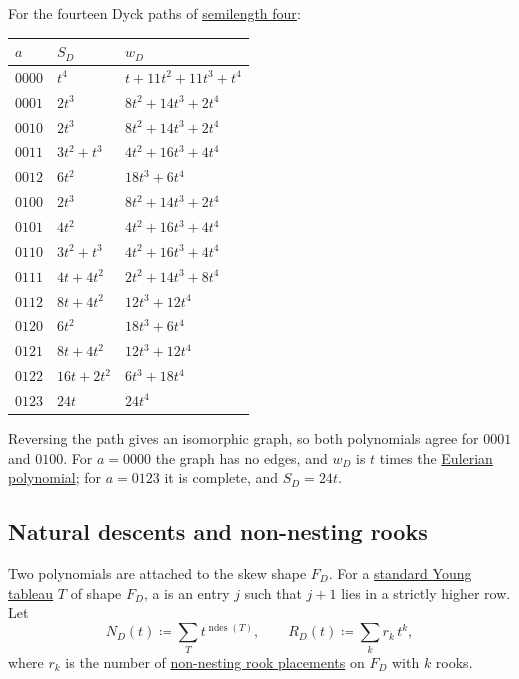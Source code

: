 \begin{example*}
For the fourteen Dyck paths of
\hyperref[dyckPathSemilengthFour]{semilength four}:

\begin{tabular}{lll}
\toprule
$a$ & $S_D$ & $w_D$ \\
\midrule
$0000$ & $t^4$ & $t+11t^2+11t^3+t^4$ \\
$0001$ & $2t^3$ & $8t^2+14t^3+2t^4$ \\
$0010$ & $2t^3$ & $8t^2+14t^3+2t^4$ \\
$0011$ & $3t^2+t^3$ & $4t^2+16t^3+4t^4$ \\
$0012$ & $6t^2$ & $18t^3+6t^4$ \\
$0100$ & $2t^3$ & $8t^2+14t^3+2t^4$ \\
$0101$ & $4t^2$ & $4t^2+16t^3+4t^4$ \\
$0110$ & $3t^2+t^3$ & $4t^2+16t^3+4t^4$ \\
$0111$ & $4t+4t^2$ & $2t^2+14t^3+8t^4$ \\
$0112$ & $8t+4t^2$ & $12t^3+12t^4$ \\
$0120$ & $6t^2$ & $18t^3+6t^4$ \\
$0121$ & $8t+4t^2$ & $12t^3+12t^4$ \\
$0122$ & $16t+2t^2$ & $6t^3+18t^4$ \\
$0123$ & $24t$ & $24t^4$ \\
\bottomrule
\end{tabular}

Reversing the path gives an isomorphic graph, so both polynomials agree for
$0001$ and $0100$.  For $a=0000$ the graph has no edges, and $w_D$ is $t$
times the \hyperref[eulerianPolynomial]{Eulerian polynomial}; for $a=0123$ it
is complete, and $S_D=24t$.
\end{example*}


\subsection[dyckPathSkewPolynomials]{Natural descents and non-nesting rooks}

Two polynomials are attached to the skew shape $F_D$.  For a
\hyperref[standardYoungTableau]{standard Young tableau} $T$ of shape $F_D$, a
 is an entry $j$ such that $j+1$ lies in a strictly
higher row.  Let
\[
  N_D(t)\coloneqq\sum_{T}t^{\operatorname{ndes}(T)},\qquad
  R_D(t)\coloneqq\sum_{k}r_k\,t^k,
\]
where $r_k$ is the number of
\hyperref[nonNestingRookPlacement]{non-nesting rook placements} on $F_D$ with
$k$ rooks.

